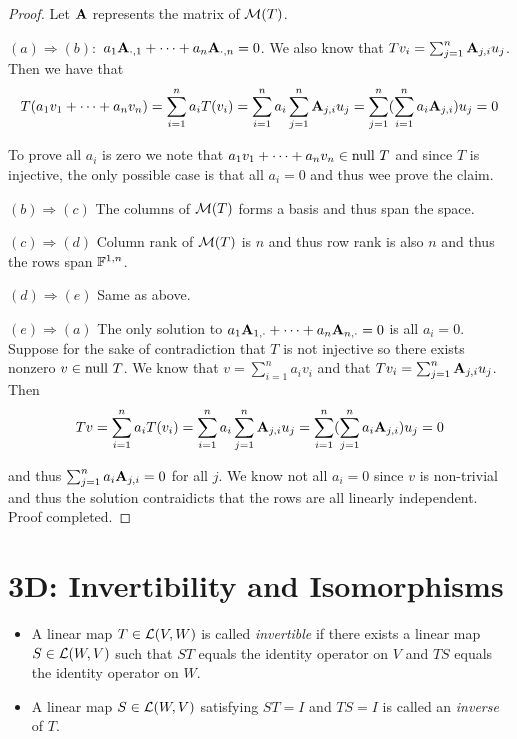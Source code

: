 \documentclass{extarticle}
\begin{document}
\begin{proof}

    Let \(\mathbf{A}\) represents the matrix of \(\mathcal{M}(T)\). 

\((a) \Rightarrow (b) \colon\) \(a_1 \mathbf{A}_{\cdot, 1} + \cdots + a_n \mathbf{A}_{\cdot, n} = 0 \). We also 
know that \(T v_i = \sum_{j=1}^{n}\mathbf{A}_{j, i} u_j\). Then we have that 
\[T(a_1 v_1 + \cdots + a_n v_n) = \sum_{i=1}^{n} a_i T(v_i) = \sum_{i=1}^{n}a_i \sum_{j=1}^{n}\mathbf{A}_{j, i} u_j 
= \sum_{j=1}^{n} (\sum_{i=1}^n a_i \mathbf{A}_{j, i}) u_j = 0 \]

To prove all \(a_i\) is zero 
we note that \(a_1 v_1 + \cdots + a_n v_n \in \text{null } T\) and since \(T\) is injective, the only possible case 
is that all \(a_i = 0\) and thus wee prove the claim. 


\((b) \Rightarrow (c)\) The columns of \(\mathcal{M}(T)\) forms a basis and thus span the space. 

\((c) \Rightarrow (d)\) Column rank of \(\mathcal{M}(T)\) is \(n\) and thus row rank is also \(n\) and thus the rows 
span \(\mathbb{F}^{1, n}\). 

\((d) \Rightarrow (e)\) Same as above. 

\((e) \Rightarrow (a)\) The only solution to \(a_1 \mathbf{A}_{1, \cdot} + \cdots + a_n \mathbf{A}_{n, \cdot} = 0\) is all 
\(a_i = 0\). Suppose for the sake of contradiction that \(T\) is not injective so there exists nonzero 
\( v \in \text{null } T\). We know that \(v = \sum_{i=1}^{n} a_i v_i\) and that \(T v_i = \sum_{j=1}^{n} \mathbf{A}_{j, i} u_j\). Then 
\[T v = \sum_{i=1}^{n} a_i T(v_i) = \sum_{i=1}^{n} a_i \sum_{j=1}^{n} \mathbf{A}_{j, i} u_j = \sum_{i=1}^{n}
(\sum_{j=1}^{n} a_i \mathbf{A}_{j, i})u_j = 0 \]

and thus \(\sum_{j=1}^{n} a_i \mathbf{A}_{j, i} = 0\) for all \(j\). We know not all \(a_i = 0\) since \(v\) is 
non-trivial and thus the solution contraidicts that the rows are all linearly independent. Proof completed.

\end{proof}




\newpage 

\section*{3D: Invertibility and Isomorphisms}

\begin{definition}
    \begin{itemize}
        \item A linear map \(T \in \mathcal{L}(V, W)\) is called \emph{invertible} if there exists a linear map 
        \(S \in \mathcal{L}(W, V)\) such that \(ST\) equals the identity operator on \(V\) and \(TS\) equals 
        the identity operator on \(W\). 
        \item A linear map \(S \in \mathcal{L}(W, V)\) satisfying \(ST = I\) and \(TS = I\) is called an 
        \emph{inverse} of \(T\). 
    \end{itemize}
\end{definition}
\end{document}

